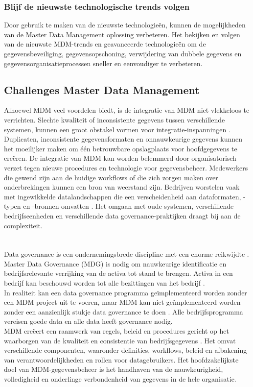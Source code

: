 \subsubsection{Blijf de nieuwste technologische trends volgen }
Door gebruik te maken van de nieuwste technologieën, kunnen de mogelijkheden van de Master Data Management oplossing verbeteren. Het bekijken en volgen van de nieuwste MDM-trends en geavanceerde technologieën om de gegevensbeveiliging, gegevensopschoning, verwijdering van dubbele gegevens en gegevensorganisatieprocessen sneller en eenvoudiger te verbeteren.

\subsection{Challenges Master Data Management}
Alhoewel  MDM veel voordelen biedt, is de integratie van MDM niet vlekkeloos te verrichten. Slechte kwaliteit of inconsistente gegevens tussen verschillende systemen, kunnen een groot obstakel vormen voor integratie-inspanningen \autocite{Pansara2024}. Duplicaten, inconsistente gegevensformaten en onnauwkeurige gegevens kunnen het moeilijker maken om één betrouwbare opslagplaats voor hoofdgegevens te creëren. De integratie van MDM kan worden belemmerd door organisatorisch verzet tegen nieuwe procedures en technologie voor gegevensbeheer. Medewerkers die gewend zijn aan de huidige workflows of die zich zorgen maken over onderbrekingen kunnen een bron van weerstand zijn. Bedrijven worstelen vaak met ingewikkelde datalandschappen die een verscheidenheid aan dataformaten, -typen en -bronnen omvatten \autocite{Sharma2020}. Het omgaan met oude systemen, verschillende bedrijfseenheden en verschillende data governance-praktijken draagt bij aan de complexiteit.


\section{}%
\label{sec:mdg}
Data governance is een ondernemingsbrede discipline met een enorme reikwijdte \autocite{Cawsey2022}. Master Data Governance (MDG) is nodig om nauwkeurige identificatie en bedrijfsrelevante verrijking van de activa tot stand te brengen. Activa in een bedrijf kan beschouwd worden tot alle bezittingen van het bedrijf \autocite{Informer2023}. 
\\In realiteit kan een data governance programma geïmplementeerd worden zonder een MDM-project uit te voeren, maar MDM kan niet geïmplementeerd worden zonder een aanzienlijk stukje data governance te doen  \autocite{Collibra2023}. Alle bedrijfsprogramma vereisen goede data en alle data heeft governance nodig. 
\\MDM creëert een raamwerk van regels, beleid en procedures gericht op het waarborgen van de kwaliteit en consistentie van bedrijfsgegevens \autocite{Shewaramani2023}. Het omvat verschillende componenten, waaronder definities, workflows, beleid en afbakening van verantwoordelijkheden en rollen voor datagebruikers. Het hoofdzakelijkste doel van  MDM-gegevensbeheer is het handhaven van de nauwkeurigheid, volledigheid en onderlinge verbondenheid van gegevens in de hele organisatie. 

